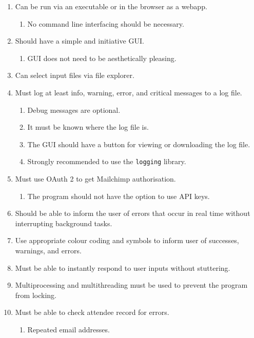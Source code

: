 \documentclass[11pt]{article}
\begin{document}
\begin{enumerate}
    \item Can be run via an executable or in the browser as a webapp.
    \begin{enumerate}
        \item No command line interfacing should be necessary.
    \end{enumerate}
    \item Should have a simple and initiative GUI.
    \begin{enumerate}
        \item GUI does not need to be aesthetically pleasing.
    \end{enumerate}
    \item Can select input files via file explorer.
    \item Must log at least info, warning, error, and critical messages to a log file.
    \begin{enumerate}
        \item Debug messages are optional.
        \item It must be known where the log file is.
        \item The GUI should have a button for viewing or downloading the log file.
        \item Strongly recommended to use the \texttt{logging} library.
    \end{enumerate}
    \item Must use OAuth 2 to get Mailchimp authorisation.
    \begin{enumerate}
        \item The program should not have the option to use API keys.
    \end{enumerate}
    \item Should be able to inform the user of errors that occur in real time without interrupting background tasks.
    \item Use appropriate colour coding and symbols to inform user of successes, warnings, and errors.
    \item Must be able to instantly respond to user inputs without stuttering.
    \item Multiprocessing and multithreading must be used to prevent the program from locking.
    \item Must be able to check attendee record for errors.
    \begin{enumerate}
        \item Repeated email addresses.

\end{enumerate}
\end{enumerate}
\end{document}
